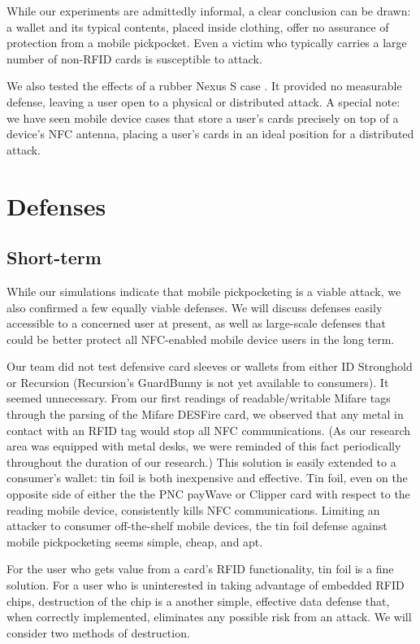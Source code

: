 \documentclass{IEEEtran}
\begin{document}
While our experiments are admittedly informal, a clear conclusion can be drawn:  a wallet and its typical contents, placed inside clothing, offer no assurance of protection from a mobile pickpocket.  Even a victim who typically carries a large number of non-RFID cards is susceptible to attack.

We also tested the effects of a rubber Nexus S case \cite{ebay-epik-nexus-s-case}.  It provided no measurable defense, leaving a user open to a physical or distributed attack.  A special note:  we have seen mobile device cases \cite{ebay-fluffy-nexus-s-case} that store a user's cards precisely on top of a device's NFC antenna, placing a user's cards in an ideal position for a distributed attack.

\section{Defenses}
\subsection{Short-term}
While our simulations indicate that mobile pickpocketing is a viable attack, we also confirmed a few equally viable defenses.  We will discuss defenses easily accessible to a concerned user at present, as well as large-scale defenses that could be better protect all NFC-enabled mobile device users in the long term.

Our team did not test defensive card sleeves or wallets from either ID Stronghold or Recursion (Recursion's GuardBunny is not yet available to consumers).  It seemed unnecessary.  From our first readings of readable/writable Mifare tags through the parsing of the Mifare DESFire card, we observed that any metal in contact with an RFID tag would stop all NFC communications.  (As our research area was equipped with metal desks, we were reminded of this fact periodically throughout the duration of our research.)  This solution is easily extended to a consumer's wallet: tin foil is both inexpensive and effective.  Tin foil, even on the opposite side of either the the PNC payWave or Clipper card with respect to the reading mobile device, consistently kills NFC communications.  Limiting an attacker to consumer off-the-shelf mobile devices, the tin foil defense against mobile pickpocketing seems simple, cheap, and apt.

For the user who gets value from a card's RFID functionality, tin foil is a fine solution.  For a user who is uninterested in taking advantage of embedded RFID chips, destruction of the chip is a another simple, effective data defense that, when correctly implemented, eliminates any possible risk from an attack.  We will consider two methods of destruction.
\end{document}
